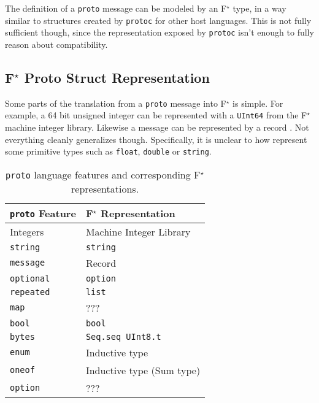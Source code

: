 \documentclass[11pt]{article}
\newcommand{\fstar}{F\(^\star\)}
\begin{document}
The definition of a \texttt{proto} message can be modeled by an \fstar{} type,
in a way similar to structures created by \texttt{protoc} for other host
languages. This is not fully sufficient though, since the representation
exposed by \texttt{protoc} isn't enough to fully reason about compatibility.

\subsection{\fstar{} Proto Struct Representation}

Some parts of the translation from a \texttt{proto} message
\autocite{LanguageGuideProto} into \fstar{} is simple. For example, a 64 bit
unsigned integer can be represented with a \texttt{UInt64} from the \fstar{}
machine integer library. Likewise a message can be represented by a record
\autocite{swamy2023proof}. Not everything cleanly generalizes
though. Specifically, it is unclear to how represent some primitive types such
as \texttt{float}, \texttt{double} or \texttt{string}.

\begin{table}[H]
	\centering
	\begin{tabular}{ll}
		\toprule
		\texttt{proto} Feature & \fstar{} Representation   \\
		\midrule
		Integers               & Machine Integer Library   \\
		\texttt{string}        & \texttt{string}           \\
		\texttt{message}       & Record                    \\
		\texttt{optional}      & \texttt{option}           \\
		\texttt{repeated}      & \texttt{list}             \\
		\texttt{map}           & ???                       \\
		\texttt{bool}          & \texttt{bool}             \\
		\texttt{bytes}         & \texttt{Seq.seq UInt8.t}  \\
		\texttt{enum}          & Inductive type            \\
		\texttt{oneof}         & Inductive type (Sum type) \\
		\texttt{option}        & ???                       \\
		\bottomrule
	\end{tabular}

	\vspace{4mm}
	\caption[]{\texttt{proto} language features and corresponding \fstar{} representations.}
\end{table}
\end{document}
